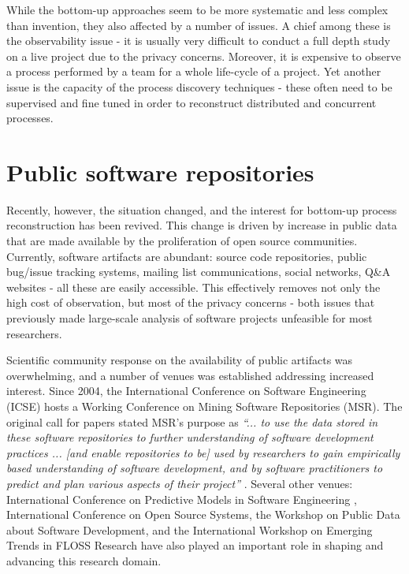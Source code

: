 While the bottom-up approaches seem to be more systematic and less complex than invention, they 
also affected by a number of issues. A chief among these is the observability issue - 
it is usually very difficult to conduct a full depth study on a live project due to the privacy concerns. 
Moreover, it is expensive to observe a process performed by a team for a whole life-cycle of a project. 
Yet another issue is the capacity of the process discovery techniques - these often need to be supervised 
and fine tuned in order to reconstruct distributed and concurrent processes. 

\section{Public software repositories}\label{section_public_repositories}
Recently, however, the situation changed, and the interest for bottom-up process reconstruction has 
been revived. This change is driven by increase in public data that are made available by the 
proliferation of open source communities.
Currently, software artifacts are abundant: source code repositories, public bug/issue tracking systems, 
mailing list communications, social networks, Q\&A websites - all these are easily accessible. 
This effectively removes not only the high cost of observation, but most of the privacy concerns - both 
issues that previously made large-scale analysis of software projects unfeasible for most researchers.

Scientific community response on the availability of public artifacts was overwhelming, and a number of 
venues was established addressing increased interest. 
Since 2004, the International Conference on Software Engineering (ICSE) hosts a Working Conference on 
Mining Software Repositories (MSR). The original call for papers stated MSR's purpose as 
\textit{``... to use the data stored in these software repositories to further understanding of software 
development practices ... [and enable repositories to be] used by researchers to gain empirically based 
understanding of software development, and by software practitioners to predict and plan various aspects 
of their project''} \cite{msr2004} \cite{citeulike:7853299}. 
Several other venues: International Conference on Predictive Models in Software Engineering \cite{promise12}, 
International Conference on Open Source Systems, the Workshop on Public Data about Software Development, 
and the International Workshop on Emerging Trends in FLOSS Research have also played
an important role in shaping and advancing this research domain.

